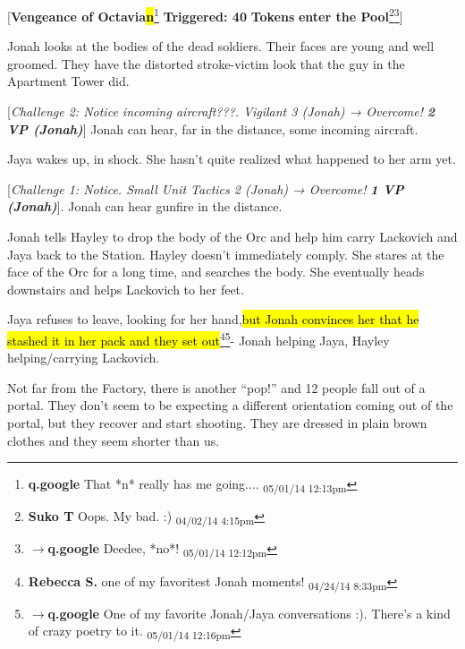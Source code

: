 {[}\textbf{Vengeance of Octavia}\textbf{\hl{n}}\footnote{\textbf{q.google }That *n* really has me going.... \textsubscript{05/01/14 12:13pm}}\textbf{ Triggered: 40}\textbf{ Tokens}\textbf{ enter the Pool}\footnote{\textbf{Suko T }Oops.  My bad.  :) \textsubscript{04/02/14 4:15pm}}\footnote{$\rightarrow$\textbf{q.google }Deedee, *no*! \textsubscript{05/01/14 12:12pm}}{]}



Jonah looks at the bodies of the dead soldiers.  Their faces are young and well groomed. They have the distorted stroke-victim look that the guy in the Apartment Tower did.



{[}\textit{Challenge 2: Notice incoming aircraft}\textit{???}\textit{.  Vigilant 3 (Jonah)  → Overcome! }\textit{\textbf{2 VP (Jonah)}}{]}  Jonah can hear, far in the distance, some incoming aircraft.



Jaya wakes up, in shock. She hasn't quite realized what happened to her arm yet.



{[}\textit{Challenge 1: Notice.  Small Unit Tactics 2 (Jonah)  → Overcome! }\textit{\textbf{1 VP (Jonah)}}{]}.  Jonah can hear gunfire in the distance.



Jonah tells Hayley to drop the body of the Orc and help him carry Lackovich and Jaya back to the Station.  Hayley doesn't immediately comply.  She stares at the face of the Orc for a long time, and searches the body.  She eventually heads downstairs and helps Lackovich to her feet.



Jaya refuses to leave, looking for her hand,\hl{but Jonah convinces her that he stashed it in her pack and they set out}\footnote{\textbf{Rebecca S. }one of my favoritest Jonah moments! \textsubscript{04/24/14 8:33pm}}\footnote{$\rightarrow$\textbf{q.google }One of my favorite Jonah/Jaya conversations :).  There's a kind of crazy poetry to it. \textsubscript{05/01/14 12:16pm}}- Jonah helping Jaya, Hayley helping/carrying Lackovich.



Not far from the Factory, there is another ``pop!'' and 12 people fall out of a portal.  They don't seem to be expecting a different orientation coming out of the portal, but they recover and start shooting.  They are dressed in plain brown clothes and they seem shorter than us.



